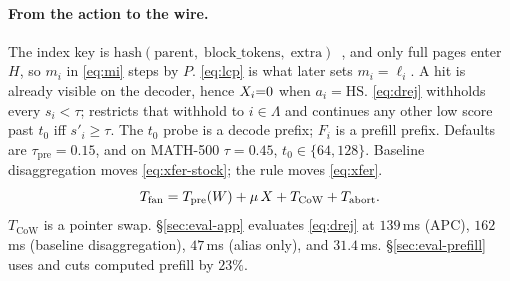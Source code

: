 \paragraph{From the action to the wire.}
The index key is $\mathrm{hash}(\mathrm{parent},\;\mathrm{block\_tokens},\;\mathrm{extra})$~\cite{vllm}, and only full pages enter $H$, so $m_i$ in \eqref{eq:mi} steps by $P$.
\eqref{eq:lcp} is what later sets $m_i{=}\ell_i$.
A hit is already visible on the decoder, hence $X_i{=}0$ when $a_i{=}\mathrm{HS}$.
\eqref{eq:drej} withholds every $s_i{<}\tau$;  restricts that withhold to $i{\in}\Lambda$ and continues any other low score past $t_0$ iff $s'_i{\ge}\tau$.
The $t_0$ probe is a decode prefix; $F_i$ is a prefill prefix.
Defaults are $\tau_{\mathrm{pre}}{=}0.15$, and on MATH-500 $\tau{=}0.45$, $t_0{\in}\{64,128\}$.
Baseline disaggregation moves \eqref{eq:xfer-stock}; the rule moves \eqref{eq:xfer}.
\begin{equation}
\label{eq:tfan}
T_{\mathrm{fan}}=T_{\mathrm{pre}}(W)+\mu\,X+T_{\mathrm{CoW}}+T_{\mathrm{abort}}.
\end{equation}
$T_{\mathrm{CoW}}$ is a pointer swap.
\S\ref{sec:eval-app} evaluates \eqref{eq:drej} at $139$\,ms (APC), $162$\,ms (baseline disaggregation), $47$\,ms (alias only), and $31.4$\,ms.
\S\ref{sec:eval-prefill} uses  and cuts computed prefill by $23\%$.

